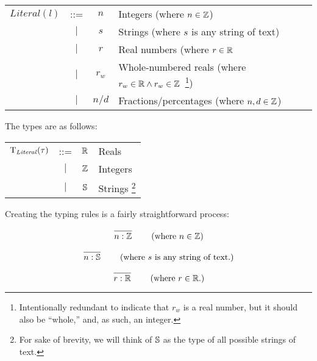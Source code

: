 \begin{longtable}{ r c c l}
      \(\mathit{Literal}(l)\) & ::=       & \(n\)              & Integers (where \(n \in \mathbb{Z}\))                \\
                              & \(\vert\) & \(s\)              & Strings (where \(s\) is any string of text)      \\
                              & \(\vert\) & \(r\)              & Real numbers (where \(r \in \mathbb{R}\)             \\
                              & \(\vert\) & \(r_w\)            & Whole-numbered
      reals (where \(r_w \in \mathbb{R} \land r_w \in \mathbb{Z}\)\
      \footnote{Intentionally redundant to indicate that \(r_w\) is a real
      number, but it should also be ``whole,'' and, as such, an integer.})                                        \\
                              & \(\vert\) & \(n \texttt{/} d\) & Fractions/percentages (where \(n,d \in \mathbb{Z}\)) \\
\end{longtable}

The types are as follows:

\begin{longtable}{ r c c l}
      \(\mathrm{T}_{\mathit{Literal}}(\tau)\) & ::=       & \(\mathbb{R}\) & Reals    \\
                                        & \(\vert\) & \(\mathbb{Z}\) & Integers \\
                                        & \(\vert\) & \(\mathbb{S}\) & Strings
      \footnote{For sake of brevity, we will think of \(\mathbb{S}\) as the type of
            all possible strings of text.}
\end{longtable}

Creating the typing rules is a fairly straightforward process:

\begin{equation}
      \left.
      \infer{n : \bb{Z}}{}
      \right.
      \qquad
      \text{(where \(n \in \bb{Z}\))}
      \label{tr:lit:int}
\end{equation}

\begin{equation}
      \left.
      \infer{n : \bb{S}}{}
      \right.
      \qquad
      \text{(where \(s\) is any string of text.)}
      \label{tr:lit:string}
\end{equation}

\begin{equation}
      \left.
      \infer{r : \bb{R}}{}
      \right.
      \qquad
      \text{(where \(r \in \bb{R}\).)}
      \label{tr:lit:real}
\end{equation}

